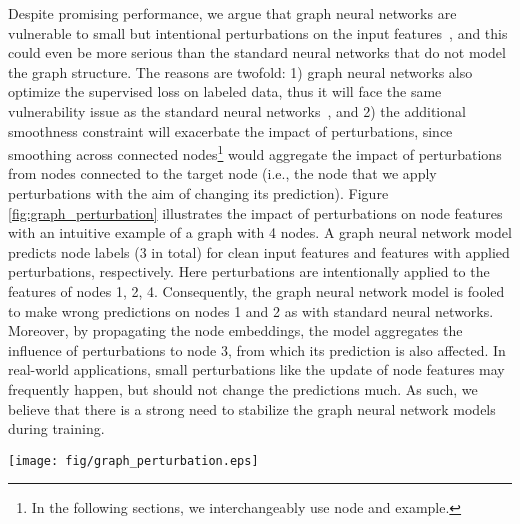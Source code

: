\documentclass[10pt,journal,compsoc]{IEEEtran}
\begin{document}
Despite promising performance, we argue that graph neural networks are vulnerable to small but intentional perturbations on the input features~\cite{zugner2018adversarial,Zhu2019Robust}, and this could even be more serious than the standard neural networks that do not model the graph structure. 
The reasons are twofold: 1) graph neural networks also optimize the supervised loss on labeled data, thus it will face the same vulnerability issue as the standard neural networks~\cite{goodfellow2015explaining}, and 2) the additional smoothness constraint will exacerbate the impact of perturbations, since smoothing across connected nodes\footnote{In the following sections, we interchangeably use node and example.} would aggregate the impact of perturbations from nodes connected to the target node (i.e., the node that we apply perturbations with the aim of changing its prediction). 
Figure \ref{fig:graph_perturbation} illustrates the impact of perturbations on node features with an intuitive example of a graph with 4 nodes. A graph neural network model predicts node labels (3 in total) for clean input features and features with applied perturbations, respectively. 
Here perturbations are intentionally applied to the features of nodes 1, 2, 4. Consequently, the graph neural network model is fooled to make wrong predictions on nodes 1 and 2 as with standard neural networks. Moreover, by propagating the node embeddings, the model aggregates the influence of perturbations to node 3, from which its prediction is also affected. 
In real-world applications, small perturbations like the update of node features may frequently happen, but should not change the predictions much. As such, we believe that there is a strong need to stabilize the graph neural network models during training. 
\begin{figure*}[]
	\centering
	\texttt{[image: fig/graph\_perturbation.eps]} 
	\vspace{-0.2cm}
	\caption{An intuitive example to illustrate the impact of applying perturbations to the input node features on the prediction of graph neural networks. Here the model implements the graph smoothness constraint via propagating node embeddings over the graph. On the right, the model propagates the applied perturbations on the connected nodes of the target node 3, leading to a wrong prediction. Moreover, the perturbations on node 1 and 2 directly lead to the wrong associated predictions like in the standard neural networks. (Better viewed in color.)}
\label{fig:graph_perturbation}
\end{figure*}
\end{document}
